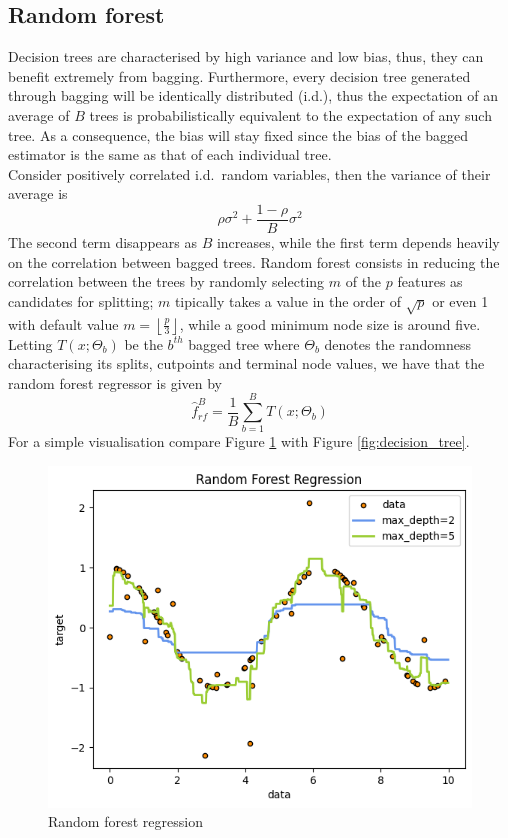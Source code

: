 \subsection{Random forest}
Decision trees are characterised by high variance and low bias, thus, they can benefit extremely from bagging. Furthermore, every decision tree generated through bagging will be identically distributed (i.d.), thus the expectation of an average of $B$ trees is probabilistically equivalent to the expectation of any such tree. As a consequence, the bias will stay fixed since the bias of the bagged estimator is the same as that of each individual tree. 
\\
Consider positively correlated i.d.\ random variables, then the variance of their average is 
\begin{equation}
    \rho \sigma^2+\frac{1-\rho}{B}\sigma^2
\end{equation}
The second term disappears as $B$ increases, while the first term depends heavily on the correlation between bagged trees. Random forest consists in reducing the correlation between the trees by randomly selecting $m$ of the $p$ features as candidates for splitting; $m$ tipically takes a value in the order of $\sqrt{p}$ or even 1 with default value $m=\left\lfloor \frac{p}{3} \right\rfloor$, while a good minimum node size is around five. 
\\
Letting $T(x;\Theta_b)$ be the $b^{th}$ bagged tree where $\Theta_b$ denotes the randomness characterising its splits, cutpoints and terminal node values, we have that the random forest regressor is given by
\begin{equation}
    \hat{f}_{rf}^{B}=\frac{1}{B}\sum\limits_{b=1}^{B}T(x;\Theta_b)
\end{equation}
For a simple visualisation compare Figure \ref{fig:random_forest} with Figure \ref{fig:decision_tree}.
\begin{figure}
    \includegraphics[width=\textwidth]{images/random_forest.png}
    \caption{Random forest regression}
    \label{fig:random_forest}
\end{figure}



